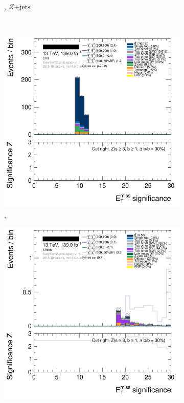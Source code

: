 \begin{figure}[tp]
\begin{subfigure}{0.495\textwidth}
\caption{\crz, $Z\mathrm{+jets}$}
\label{fig:2ljets_splits_zjets}
\end{subfigure}
\\[0.5em]
\begin{subfigure}{0.495\textwidth}
\centering
\includegraphics[width=\textwidth]{figures/2ljets_splits_met_Sign_CRtt.png}
\caption{\crtt, \topother}
\label{fig:2ljets_splits_topother1}
\end{subfigure}
\hfill
\begin{subfigure}{0.495\textwidth}
\centering
\includegraphics[width=\textwidth]{figures/2ljets_splits_met_Sign_SRllbb.png}

\end{subfigure}
\end{figure}
